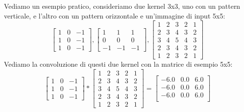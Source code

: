 \vspace{1cm}
Vediamo un esempio pratico, consideriamo due kernel 3x3, uno con un pattern verticale, e l'altro con un pattern orizzontale e un'immagine di input 5x5:
\begin{equation}
    \label{eq:kernel_v_det_example}
    \begin{bmatrix}
        1 & 0 & -1 \\
        1 & 0 & -1 \\
        1 & 0 & -1
    \end{bmatrix} , 
    \begin{bmatrix}
        1 & 1 & 1 \\
        0 & 0 & 0 \\
        -1 & -1 & -1
    \end{bmatrix} ,
    \begin{bmatrix}
        1 & 2 & 3 & 2 & 1 \\
        2 & 3 & 4 & 3 & 2 \\
        3 & 4 & 5 & 4 & 3 \\
        2 & 3 & 4 & 3 & 2 \\
        1 & 2 & 3 & 2 & 1
    \end{bmatrix}
\end{equation}
Vediamo la convoluzione di questi due kernel con la matrice di esempio 5x5:
\begin{equation}
    \label{eq:convolution_example}
    \begin{bmatrix}
        1 & 0 & -1 \\
        1 & 0 & -1 \\
        1 & 0 & -1
    \end{bmatrix} *
    \begin{bmatrix}
        1 & 2 & 3 & 2 & 1 \\
        2 & 3 & 4 & 3 & 2 \\
        3 & 4 & 5 & 4 & 3 \\
        2 & 3 & 4 & 3 & 2 \\
        1 & 2 & 3 & 2 & 1
    \end{bmatrix} =
    \begin{bmatrix}
        -6.0 & 0.0 & 6.0 \\
        -6.0 & 0.0 & 6.0 \\
        -6.0 & 0.0 & 6.0 \\
    \end{bmatrix}
\end{equation}
